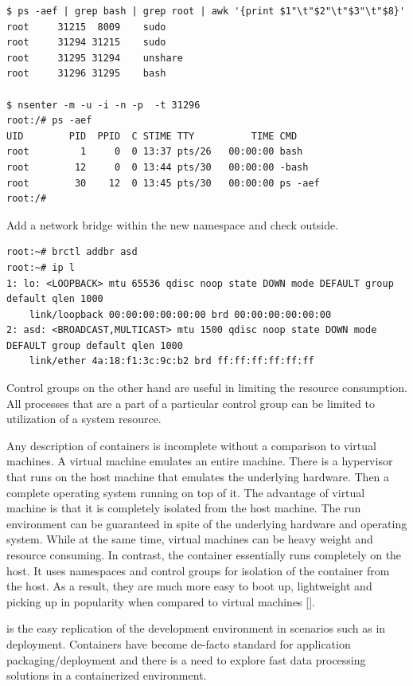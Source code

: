 \documentclass[english, 12pt, a4paper, elec, utf8, a-1b, online]{aaltothesis}
\begin{document}
\begin{verbatim}
$ ps -aef | grep bash | grep root | awk '{print $1"\t"$2"\t"$3"\t"$8}'
root     31215  8009    sudo
root     31294 31215    sudo
root     31295 31294    unshare
root     31296 31295    bash

$ nsenter -m -u -i -n -p  -t 31296
root:/# ps -aef
UID        PID  PPID  C STIME TTY          TIME CMD
root         1     0  0 13:37 pts/26   00:00:00 bash
root        12     0  0 13:44 pts/30   00:00:00 -bash
root        30    12  0 13:45 pts/30   00:00:00 ps -aef
root:/# 

\end{verbatim}

Add a network bridge within the new namespace and check outside.

\begin{verbatim}
root:~# brctl addbr asd
root:~# ip l
1: lo: <LOOPBACK> mtu 65536 qdisc noop state DOWN mode DEFAULT group default qlen 1000
    link/loopback 00:00:00:00:00:00 brd 00:00:00:00:00:00
2: asd: <BROADCAST,MULTICAST> mtu 1500 qdisc noop state DOWN mode DEFAULT group default qlen 1000
    link/ether 4a:18:f1:3c:9c:b2 brd ff:ff:ff:ff:ff:ff
\end{verbatim}

Control groups on the other hand are useful in limiting the resource consumption. All processes that are a part of a particular control group can be limited to utilization of a system resource.

Any description of containers is incomplete without a comparison to virtual machines. A virtual machine emulates an entire machine. There is a hypervisor that runs on the host machine that emulates the underlying hardware. Then a complete operating system running on top of it. The advantage of virtual machine is that it is completely isolated from the host machine. The run environment can be guaranteed in spite of the underlying hardware and operating system. While at the same time, virtual machines can be heavy weight and resource consuming. In contrast, the container essentially runs completely on the host. It uses namespaces and control groups for isolation of the container from the host. As a result, they are much more easy to boot up, lightweight and picking up in popularity when compared to virtual machines [].


is the easy replication of the development environment in scenarios such as in deployment. Containers have become de-facto standard for application packaging/deployment and there is a need to explore fast data processing solutions in a containerized environment.
\end{document}
